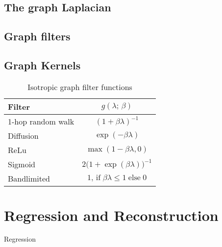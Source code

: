 \subsection{The graph Laplacian}

\cite{LeMagoarou2016}


\subsection{Graph filters}

\subsection{Graph Kernels}

\label{sec:graph_kernels}

\cite{Kondor2002}

\cite{Smola2003}

\cite{Zhu2003}

\cite{Zhi2023}


\begin{table}[b]
    \renewcommand{\arraystretch}{1.7}
    \small
    \begin{center}
    \begin{tabular}{|l|c|}
    \hline
    \textbf{Filter}   & $g(\lambda; \,\beta)$    \\ 
    \hline
    1-hop random walk & $(1 + \beta \lambda)^{-1}$ \\
    \hline
    Diffusion         & $\exp(-\beta \lambda)$       \\
    \hline
    ReLu              & $\max (1 - \beta \lambda, 0)$  \\
    \hline
    Sigmoid           & $2 \big( 1 + \exp(\beta \lambda)\big)^{-1}$ \\
    \hline
    Bandlimited       & $1, \,\text{if} \; \beta \lambda \leq 1 \; \text{else} \; 0$   \\
    \hline
    \end{tabular}
    \end{center}
    \caption{Isotropic graph filter functions}
    \label{tab:iso_filters}
    \end{table}



\section{Regression and Reconstruction}

\cite{Guestrin2004} Regression


